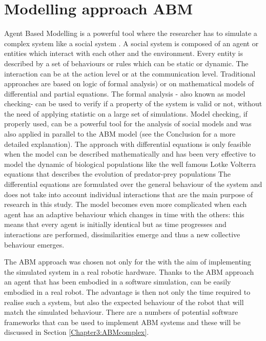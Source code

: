 \section{Modelling approach ABM}
Agent Based Modelling is a powerful tool where the researcher has to simulate a complex
system like a social system \citep{WMacyWiller2002:SocialABM}.
A social system is composed of an agent or entities which interact with each
other and the environment.
Every entity is described by a set of behaviours or rules which can be static
or dynamic.
The interaction can be at the action level or at the communication level.
Traditional approaches are based on logic of formal analysis) or on
mathematical models of differential and partial equations.
The formal analysis - also known as model checking- can be used to verify if a
property of the system is valid or not, without the need of applying statistic
on a large set of simulations.
Model checking, if properly used, can be a powerful tool for the analysis of
social models and was also applied in parallel to the ABM model (see the Conclusion
for a more detailed explanation).
The approach with differential equations is only feasible when the model can 
be described mathematically and has been very effective to model the dynamic of biological
populations like the well famous Lotke Volterra equations \citep{LotkeVolterra1931:PredatorPrey} that describes the
 evolution of predator-prey populations 
The differential equations are formulated over the general behaviour of the system
 and does not take into account individual interactions that are the main 
purpose of research in this study.
The model becomes even more complicated when each agent has an adaptive
behaviour which changes in time with the others: this means that every
agent is initially identical but as time progresses and interactions are
performed, dissimilarities emerge and thus a new collective behaviour emerges.

The ABM approach was chosen not only for the with the aim of implementing the simulated system
 in a real robotic hardware.
Thanks to the ABM approach an agent that has been embodied in a software simulation,
 can be easily embodied in a real robot.
The advantage is then not only the time required to realise such a system,
but also the expected behaviour of the robot that will match the simulated behaviour.
There are a numbers of potential software frameworks that can be used to
implement ABM systems and these will be discussed in Section
\ref{Chapter3:ABMcomplex}.


